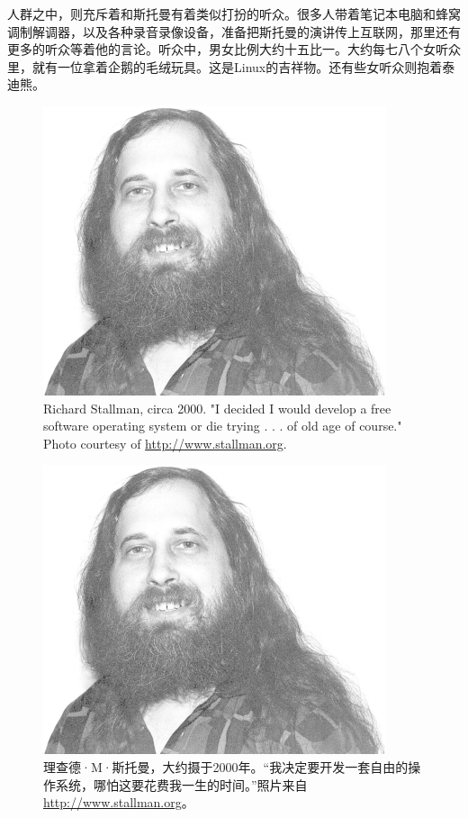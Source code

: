 \ifdefined\chs
人群之中，则充斥着和斯托曼有着类似打扮的听众。很多人带着笔记本电脑和蜂窝调制解调器，以及各种录音录像设备，准备把斯托曼的演讲传上互联网，那里还有更多的听众等着他的言论。听众中，男女比例大约十五比一。大约每七八个女听众里，就有一位拿着企鹅的毛绒玩具。这是Linux的吉祥物。还有些女听众则抱着泰迪熊。
\fi

\ifdefined\eng
\begin{figure}[ht] \centering
  \includegraphics[width=\textwidth]{free_0201}
  \caption{Richard Stallman, circa 2000. "I decided I would develop a free software operating system or die trying . . . of old age of course." Photo courtesy of \url{http://www.stallman.org}.}
\end{figure}
\fi

\ifdefined\chs
\begin{figure}[ht] \centering
  \includegraphics[width=\textwidth]{free_0201}
  \caption{理查德·M·斯托曼，大约摄于2000年。“我决定要开发一套自由的操作系统，哪怕这要花费我一生的时间。”照片来自\url{http://www.stallman.org}。}
\end{figure}
\fi

